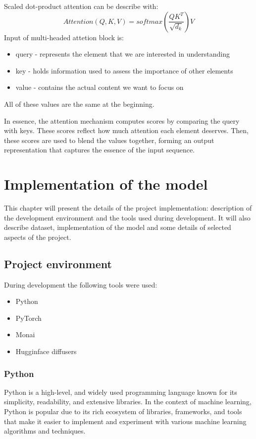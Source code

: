 \documentclass[11pt,a4paper]{report}
\begin{document}
Scaled dot-product attention can be describe with:
\[Attention(Q,K,V) = softmax(\frac{QK^T}{\sqrt{d_k}})V\]
Input of multi-headed attetion block is:
\begin{itemize}
\item query - represents the element that we are interested in understanding
\item key - holds information used to assess the importance of other elements
\item value - contains the actual content we want to focus on
\end{itemize}
All of these values are the same at the beginning.

In essence, the attention mechanism computes scores by comparing the query with keys. These scores reflect how much attention each element deserves. Then, these scores are used to blend the values together, forming an output representation that captures the essence of the input sequence. \cite{AttentionIsAll} \cite{AttentionWiki} \cite{TransformersWiki}

\chapter{Implementation of the model}
This chapter will present the details of the project implementation: description of the development environment and the tools used during development. It will also describe dataset, implementation of the model and some details of selected aspects of the project.
\section{Project environment}
During development the following tools were used:
\begin{itemize}
\item Python 
\item PyTorch
\item Monai
\item Hugginface diffusers 
\end{itemize}
\subsection{Python}
Python is a high-level, and widely used programming language known for its simplicity, readability, and extensive libraries. In the context of machine learning, Python is popular due to its rich ecosystem of libraries, frameworks, and tools that make it easier to implement and experiment with various machine learning algorithms and techniques. \cite{Python}
\end{document}

